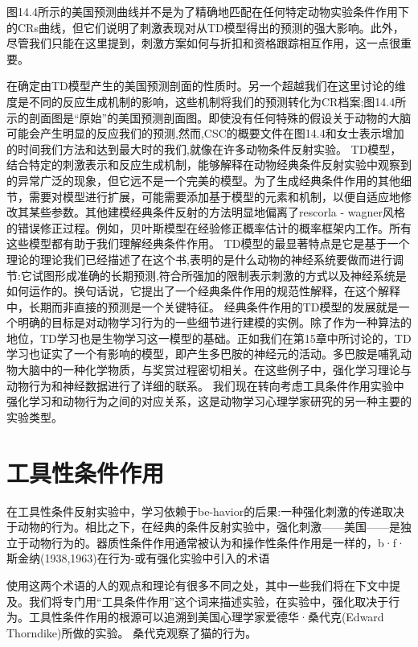 图14.4所示的美国预测曲线并不是为了精确地匹配在任何特定动物实验条件作用下的CRs曲线，但它们说明了刺激表现对从TD模型得出的预测的强大影响。此外，尽管我们只能在这里提到，刺激方案如何与折扣和资格跟踪相互作用，这一点很重要。

在确定由TD模型产生的美国预测剖面的性质时。另一个超越我们在这里讨论的维度是不同的反应生成机制的影响，这些机制将我们的预测转化为CR档案;图14.4所示的剖面图是“原始”的美国预测剖面图。即使没有任何特殊的假设关于动物的大脑可能会产生明显的反应我们的预测,然而,CSC的概要文件在图14.4和女士表示增加的时间我们方法和达到最大时的我们,就像在许多动物条件反射实验。
TD模型，结合特定的刺激表示和反应生成机制，能够解释在动物经典条件反射实验中观察到的异常广泛的现象，但它远不是一个完美的模型。为了生成经典条件作用的其他细节，需要对模型进行扩展，可能需要添加基于模型的元素和机制，以便自适应地修改其某些参数。其他建模经典条件反射的方法明显地偏离了rescorla - wagner风格的错误修正过程。例如，贝叶斯模型在经验修正概率估计的概率框架内工作。所有这些模型都有助于我们理解经典条件作用。
TD模型的最显著特点是它是基于一个理论的理论我们已经描述了在这个书,表明的是什么动物的神经系统要做而进行调节:它试图形成准确的长期预测,符合所强加的限制表示刺激的方式以及神经系统是如何运作的。换句话说，它提出了一个经典条件作用的规范性解释，在这个解释中，长期而非直接的预测是一个关键特征。
经典条件作用的TD模型的发展就是一个明确的目标是对动物学习行为的一些细节进行建模的实例。除了作为一种算法的地位，TD学习也是生物学习这一模型的基础。正如我们在第15章中所讨论的，TD学习也证实了一个有影响的模型，即产生多巴胺的神经元的活动。多巴胺是哺乳动物大脑中的一种化学物质，与奖赏过程密切相关。在这些例子中，强化学习理论与动物行为和神经数据进行了详细的联系。
我们现在转向考虑工具条件作用实验中强化学习和动物行为之间的对应关系，这是动物学习心理学家研究的另一种主要的实验类型。

\section{工具性条件作用}

在工具性条件反射实验中，学习依赖于be-havior的后果:一种强化刺激的传递取决于动物的行为。相比之下，在经典的条件反射实验中，强化刺激——美国——是独立于动物行为的。器质性条件作用通常被认为和操作性条件作用是一样的，b·f·斯金纳(1938,1963)在行为-或有强化实验中引入的术语

使用这两个术语的人的观点和理论有很多不同之处，其中一些我们将在下文中提及。我们将专门用“工具条件作用”这个词来描述实验，在实验中，强化取决于行为。工具性条件作用的根源可以追溯到美国心理学家爱德华·桑代克(Edward Thorndike)所做的实验。
桑代克观察了猫的行为。


